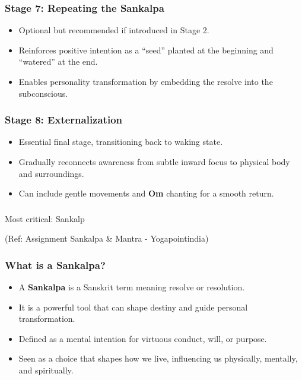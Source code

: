 \begin{frame}[fragile]\frametitle{Stage 7: Repeating the Sankalpa}
    \begin{itemize}
        \item Optional but recommended if introduced in Stage 2.
        \item Reinforces positive intention as a “seed” planted at the beginning and “watered” at the end.
        \item Enables personality transformation by embedding the resolve into the subconscious.
    \end{itemize}
\end{frame}

\begin{frame}[fragile]\frametitle{Stage 8: Externalization}
    \begin{itemize}
        \item Essential final stage, transitioning back to waking state.
        \item Gradually reconnects awareness from subtle inward focus to physical body and surroundings.
        \item Can include gentle movements and \textbf{Om} chanting for a smooth return.
    \end{itemize}
\end{frame}


\begin{frame}[fragile]\frametitle{}
\begin{center}
{\Large Most critical: Sankalp}

(Ref: Assignment Sankalpa \& Mantra - Yogapointindia)
\end{center}
\end{frame}

\begin{frame}[fragile]\frametitle{What is a Sankalpa?}
    \begin{itemize}
        \item A \textbf{Sankalpa} is a Sanskrit term meaning resolve or resolution.
        \item It is a powerful tool that can shape destiny and guide personal transformation.
        \item Defined as a mental intention for virtuous conduct, will, or purpose.
        \item Seen as a choice that shapes how we live, influencing us physically, mentally, and spiritually.
    \end{itemize}
\end{frame}

